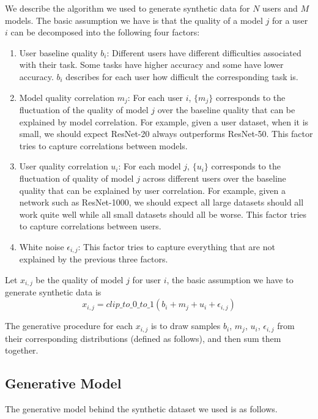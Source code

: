 We describe the algorithm we used to generate synthetic data 
for $N$ users and $M$ models. The basic assumption we have
is that the quality of a model $j$ for a user $i$ can be decomposed into
the following four factors:

\begin{enumerate}
\item User baseline quality $b_i$: Different users have different
      difficulties associated with their task. Some tasks have higher
      accuracy and some have lower accuracy. $b_i$ describes for each
      user how difficult the corresponding task is.
\item Model quality correlation $m_j$: For each user $i$, $\{m_j\}$
      corresponds to the fluctuation of the quality of model $j$ 
      over the baseline quality that can be explained by model correlation.
      For example, given a user dataset, when it is small, we should expect
      ResNet-20 always outperforms ResNet-50. This factor tries to capture
      correlations between models.
\item User quality correlation $u_i$: For each model $j$, $\{u_i\}$
      corresponds to the fluctuation of quality of model $j$ across different users
      over the baseline quality that can be explained by user correlation.
      For example, given a network such as ResNet-1000, we should expect
      all large datasets should all work quite well while all small datasets
      should all be worse. This factor tries to capture correlations between users.
\item White noise $\epsilon_{i,j}$: This factor tries to capture everything that are
      not explained by the previous three factors.
\end{enumerate}

Let $x_{i,j}$ be the quality of model $j$ for user $i$, the basic assumption we 
have to generate synthetic data is
\[
x_{i,j} = clip\_to\_0\_to\_1( b_i + m_j + u_i + \epsilon_{i,j} )
\]

The generative procedure for each $x_{i,j}$ is to draw samples 
$b_i$, $m_j$, $u_i$, $\epsilon_{i,j}$ from their corresponding 
distributions (defined as follows), and then sum them together.

\subsection{Generative Model}

The generative model behind the synthetic dataset we used is as follows.

